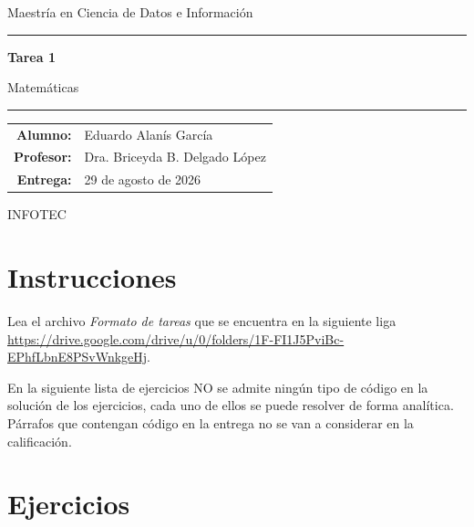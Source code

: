\documentclass[11pt,letterpaper]{article}
\newcommand{\asignaturaNombre}{Matemáticas}
\newcommand{\tareaNombre}{Tarea 1}
\newcommand{\autorNombre}{Eduardo Alanís García}
\newcommand{\profesorNombre}{Dra. Briceyda B. Delgado López}
\newcommand{\fechaEntrega}{29 de agosto de 2026}
\theoremstyle{coloredplain}
\theoremstyle{coloreddef}
\begin{document}

\begin{titlepage}
  \thispagestyle{plain}
  \centering
  \vspace*{2.5cm}

  {\sffamily\color{secondary}\large Maestría en Ciencia de Datos e Información \par}
  \vspace{0.3cm}
  {\color{primary}\rule{0.5\textwidth}{0.8pt}\par}
  \vspace{2.2cm}

  {\sffamily\bfseries\color{primary}\Huge \tareaNombre \par}
  \vspace{0.6cm}
  {\sffamily\Large \asignaturaNombre \par}

  \vspace{3.5cm}
  {\color{primary!60}\rule{0.6\textwidth}{0.4pt}\par}
  \vspace{1cm}

  \begin{tabular}{rl}
    \textbf{Alumno:}   & \autorNombre \\[2pt]
    \textbf{Profesor:} & \profesorNombre \\[2pt]
    \textbf{Entrega:}    & \fechaEntrega \\
  \end{tabular}

  \vfill
  {\small\color{secondary} INFOTEC \par}
\end{titlepage}



\section*{Instrucciones}
Lea el archivo \emph{Formato de tareas} que se encuentra en la siguiente liga
\url{https://drive.google.com/drive/u/0/folders/1F-FI1J5PviBc-EPhfLbnE8PSvWnkgeHj}.
 
En la siguiente lista de ejercicios NO se admite ningún tipo de código en la
solución de los ejercicios, cada uno de ellos se puede resolver de forma
analítica. Párrafos que contengan código en la entrega no se van a considerar
en la calificación.

\section*{Ejercicios}
\end{document}
